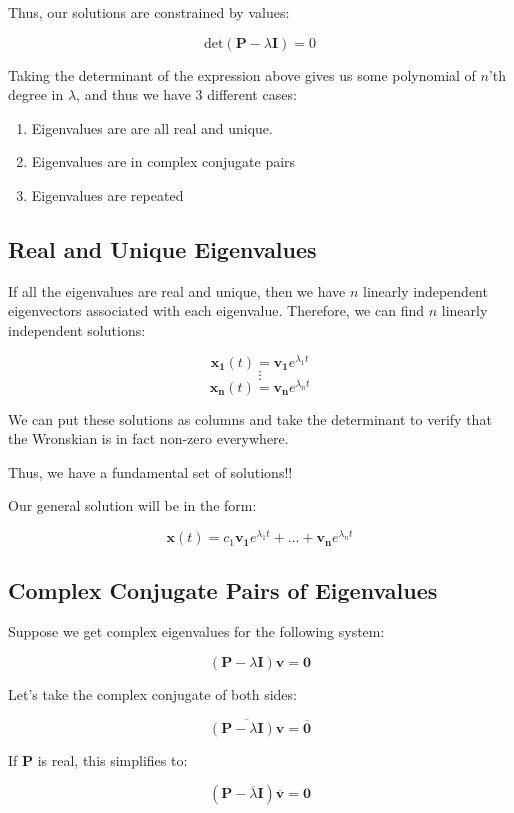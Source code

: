 \documentclass{report}
\begin{document}
Thus, our solutions are constrained by values:

$$\text{det}(\mathbf{P} - \lambda\mathbf{I}) = 0$$

Taking the determinant of the expression above gives us some polynomial of $n$'th degree in $\lambda$, and thus we have 3 different cases:

\begin{enumerate}
    \item Eigenvalues are are all real and unique.
    \item Eigenvalues are in complex conjugate pairs
    \item Eigenvalues are repeated
\end{enumerate}

\subsection{Real and Unique Eigenvalues}
If all the eigenvalues are real and unique, then we have $n$ linearly independent eigenvectors associated with each eigenvalue. Therefore, we can find $n$ linearly independent solutions:


$$ \mathbf{x_1}(t)=\mathbf{v_1}e^{\lambda_1 t}$$
$$\vdots$$
$$ \mathbf{x_n}(t)=\mathbf{v_n}e^{\lambda_n t}$$

We can put these solutions as columns and take the determinant to verify that the Wronskian is in fact non-zero everywhere.

Thus, we have a fundamental set of solutions!!

Our general solution will be in the form:

$$ \mathbf{x}(t) = c_1\mathbf{v_1}e^{\lambda_1 t} + \dots + \mathbf{v_n}e^{\lambda_n t}$$



\subsection{Complex Conjugate Pairs of Eigenvalues}
Suppose we get complex eigenvalues for the following system:

$$(\mathbf{P} - \lambda\mathbf{I})\mathbf{v} = \mathbf{0}$$

Let's take the complex conjugate of both sides:

$$\overline{(\mathbf{P} - \lambda\mathbf{I})\mathbf{v}} = \overline{\mathbf{0}}$$

If $\mathbf{P}$ is real, this simplifies to:

$$(\mathbf{P} - \overline{\lambda}\mathbf{I})\overline{\mathbf{v}}= \mathbf{0}$$
\end{document}

